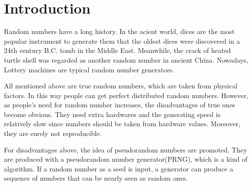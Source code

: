 \documentclass[12pt,a4paper]{article}
\begin{document}



\section{Introduction}

Random numbers have a long history. In the acient world, dices are the most popular instrument to generate them that the oldest dices were discovered in a 24th century B.C. tomb in the Middle East. Meanwhile, the crack of heated turtle shell was regarded as another random number in ancient China. Nowadays, Lottery machines are typical random number generators.

All mentioned above are true random numbers, which are taken from physical factors. In this way people can get perfect distributed random numbers. However, as people's need for random number increases, the disadvantages of true ones become obvious. They need extra hardwares and the generating speed is relatively slow since numbers should be taken from hardware values. Moreover, they are surely not reproducible. 

For disadvantages above, the idea of pseudorandom numbers are promoted. They are produced with a pseudorandom number generator(PRNG), which is a kind of algorithm. If a random number as a seed is input, a generator can produce a sequence of numbers that can be nearly seen as random ones. 





\end{document}

